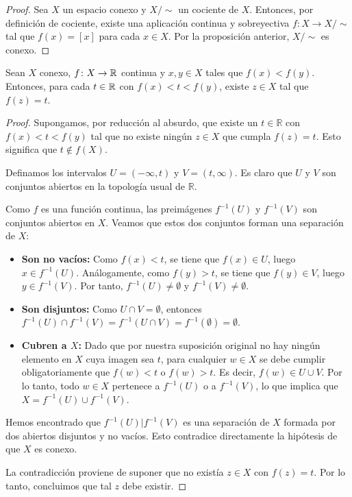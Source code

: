 \begin{proof}
    Sea $X$ un espacio conexo y $X/\sim$ un cociente de $X$. Entonces, por definición de cociente, existe una aplicación continua y sobreyectiva $f: X \to X/\sim$ tal que $f(x) = [x]$ para cada $x \in X$. Por la proposición anterior, $X/\sim$ es conexo.
\end{proof}
\begin{teorema}
    Sean $X$ conexo, $f \colon X \to \mathbb{R}$ continua y $x, y \in X$ tales que $f(x) < f(y)$. Entonces, para cada $t \in \mathbb{R}$ con $f(x) < t < f(y)$, existe $z \in X$ tal que $f(z) = t$.
\end{teorema}
\begin{proof}
    Supongamos, por reducción al absurdo, que existe un $t \in \mathbb{R}$ con $f(x) < t < f(y)$ tal que no existe ningún $z \in X$ que cumpla $f(z) = t$. Esto significa que $t \notin f(X)$.

    Definamos los intervalos $U = (-\infty, t)$ y $V = (t, \infty)$. Es claro que $U$ y $V$ son conjuntos abiertos en la topología usual de $\mathbb{R}$. 
    
    Como $f$ es una función continua, las preimágenes $f^{-1}(U)$ y $f^{-1}(V)$ son conjuntos abiertos en $X$. Veamos que estos dos conjuntos forman una separación de $X$:
    
    \begin{itemize}
        \item \textbf{Son no vacíos:} Como $f(x) < t$, se tiene que $f(x) \in U$, luego $x \in f^{-1}(U)$. Análogamente, como $f(y) > t$, se tiene que $f(y) \in V$, luego $y \in f^{-1}(V)$. Por tanto, $f^{-1}(U) \neq \emptyset$ y $f^{-1}(V) \neq \emptyset$.
        \item \textbf{Son disjuntos:} Como $U \cap V = \emptyset$, entonces $f^{-1}(U) \cap f^{-1}(V) = f^{-1}(U \cap V) = f^{-1}(\emptyset) = \emptyset$.
        \item \textbf{Cubren a $X$:} Dado que por nuestra suposición original no hay ningún elemento en $X$ cuya imagen sea $t$, para cualquier $w \in X$ se debe cumplir obligatoriamente que $f(w) < t$ o $f(w) > t$. Es decir, $f(w) \in U \cup V$. Por lo tanto, todo $w \in X$ pertenece a $f^{-1}(U)$ o a $f^{-1}(V)$, lo que implica que $X = f^{-1}(U) \cup f^{-1}(V)$.
    \end{itemize}
    
    Hemos encontrado que $f^{-1}(U) | f^{-1}(V)$ es una separación de $X$ formada por dos abiertos disjuntos y no vacíos. Esto contradice directamente la hipótesis de que $X$ es conexo. 
    
    La contradicción proviene de suponer que no existía $z \in X$ con $f(z) = t$. Por lo tanto, concluimos que tal $z$ debe existir.
\end{proof}
